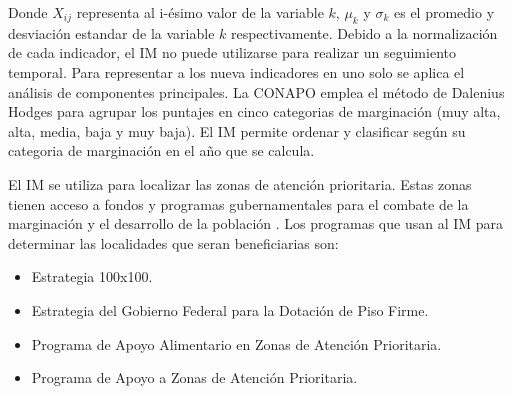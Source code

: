 Donde $X_{ij}$ representa al i-ésimo valor de la variable $k$, $\mu_k$ y $\sigma_k$ es el promedio y desviación estandar de la variable $k$ respectivamente. Debido a la normalización de cada indicador, el IM no puede utilizarse para realizar un seguimiento temporal. Para representar a los nueva indicadores en uno solo se aplica el análisis de componentes principales. La CONAPO emplea el método de Dalenius Hodges\cite{Dalenius_1959} para agrupar los puntajes en cinco categorias de marginación (muy alta, alta, media, baja y muy baja). El IM permite ordenar y clasificar según su categoria de marginación en el año que se calcula.

El IM se utiliza para localizar las zonas de atención prioritaria. Estas zonas tienen acceso a fondos y programas gubernamentales para el combate de la marginación y el desarrollo de la población \cite{DOF_2011,DOF_2012,DOF_2013,DOF_2014,DOF_2015,DOF_2016,DOF_2017,DOF_2018,DOF_2019}. Los programas que usan al IM para determinar las localidades que seran beneficiarias son:

\begin{itemize}
    \item Estrategia 100x100\cite{CONEVAL_2013}.
    \item Estrategia del Gobierno Federal para la Dotación de Piso Firme\cite{DOF_2020}.
    \item Programa de Apoyo Alimentario en Zonas de Atención Prioritaria\cite{SEDESOL_2008}.
    \item Programa de Apoyo a Zonas de Atención Prioritaria\cite{DOF_2014_zonas}.
\end{itemize}

